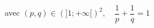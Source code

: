 \documentclass[preview]{standalone}
\begin{document}
\begin{center}
avec \((p, q)\in (]1 ; +\infty [)^2,\quad \dfrac{1}{p} + \dfrac{1}{q} = 1\)
\end{center}
\end{document}
